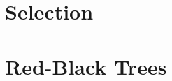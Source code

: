 \documentclass{article}
\begin{document}
\section{Selection}














\section{Red-Black Trees}
\end{document}
